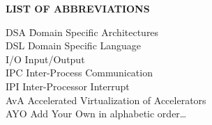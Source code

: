 {}

\begin{center}
{\normalfont \textbf{LIST OF ABBREVIATIONS}}
\end{center}

\newcommand{\Ab}[2]{\noindent  #1 \> #2 \\}
\newcommand{\Abi}[2]{\noindent #1 \hspace{1.5cm} \= #2 \\}

\begin{tabbing}
\Abi{DSA}{Domain Specific Architectures}
\Ab{DSL}{Domain Specific Language}
\Ab{I/O}{Input/Output}
\Ab{IPC}{Inter-Process Communication}
\Ab{IPI}{Inter-Processor Interrupt}
\Ab{AvA}{Accelerated Virtualization of Accelerators}
\Ab{AYO}{Add Your Own in alphabetic order\ldots}
\end{tabbing}

\clearpage
